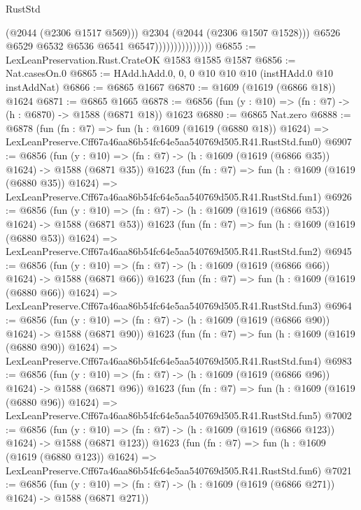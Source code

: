 \begin{lexlean}{RustStd}
\begin{coremodule}
                                      (@2044 (@2306 @1517 @569)))
                                    @2304
                                    (@2044 (@2306 @1507 @1528)))
                                  @6526
                                  @6529
                                  @6532
                                  @6536
                                  @6541
                                  @6547)))))))))))))))
@6855 := LexLeanPreservation.Rust.CrateOK @1583 @1585 @1587
@6856 := Nat.casesOn.{0}
@6865 := HAdd.hAdd.{0, 0, 0} @10 @10 @10 (instHAdd.{0} @10 instAddNat)
@6866 := @6865 @1667
@6870 := @1609 (@1619 (@6866 @18)) @1624
@6871 := @6865 @1665
@6878 := @6856 (fun (y : @10) => (fn : @7) -> (h : @6870) -> @1588 (@6871 @18)) @1623
@6880 := @6865 Nat.zero
@6888 := @6878
    (fun (fn : @7) =>
    fun (h : @1609 (@1619 (@6880 @18)) @1624) =>
    LexLeanPreserve.Cff67a46aa86b54fc64e5aa540769d505.R41.RustStd.fun0)
@6907 := @6856
    (fun (y : @10) => (fn : @7) -> (h : @1609 (@1619 (@6866 @35)) @1624) -> @1588 (@6871 @35))
    @1623
    (fun (fn : @7) =>
    fun (h : @1609 (@1619 (@6880 @35)) @1624) =>
    LexLeanPreserve.Cff67a46aa86b54fc64e5aa540769d505.R41.RustStd.fun1)
@6926 := @6856
    (fun (y : @10) => (fn : @7) -> (h : @1609 (@1619 (@6866 @53)) @1624) -> @1588 (@6871 @53))
    @1623
    (fun (fn : @7) =>
    fun (h : @1609 (@1619 (@6880 @53)) @1624) =>
    LexLeanPreserve.Cff67a46aa86b54fc64e5aa540769d505.R41.RustStd.fun2)
@6945 := @6856
    (fun (y : @10) => (fn : @7) -> (h : @1609 (@1619 (@6866 @66)) @1624) -> @1588 (@6871 @66))
    @1623
    (fun (fn : @7) =>
    fun (h : @1609 (@1619 (@6880 @66)) @1624) =>
    LexLeanPreserve.Cff67a46aa86b54fc64e5aa540769d505.R41.RustStd.fun3)
@6964 := @6856
    (fun (y : @10) => (fn : @7) -> (h : @1609 (@1619 (@6866 @90)) @1624) -> @1588 (@6871 @90))
    @1623
    (fun (fn : @7) =>
    fun (h : @1609 (@1619 (@6880 @90)) @1624) =>
    LexLeanPreserve.Cff67a46aa86b54fc64e5aa540769d505.R41.RustStd.fun4)
@6983 := @6856
    (fun (y : @10) => (fn : @7) -> (h : @1609 (@1619 (@6866 @96)) @1624) -> @1588 (@6871 @96))
    @1623
    (fun (fn : @7) =>
    fun (h : @1609 (@1619 (@6880 @96)) @1624) =>
    LexLeanPreserve.Cff67a46aa86b54fc64e5aa540769d505.R41.RustStd.fun5)
@7002 := @6856
    (fun (y : @10) => (fn : @7) -> (h : @1609 (@1619 (@6866 @123)) @1624) -> @1588 (@6871 @123))
    @1623
    (fun (fn : @7) =>
    fun (h : @1609 (@1619 (@6880 @123)) @1624) =>
    LexLeanPreserve.Cff67a46aa86b54fc64e5aa540769d505.R41.RustStd.fun6)
@7021 := @6856
    (fun (y : @10) => (fn : @7) -> (h : @1609 (@1619 (@6866 @271)) @1624) -> @1588 (@6871 @271))

\end{coremodule}
\end{lexlean}
